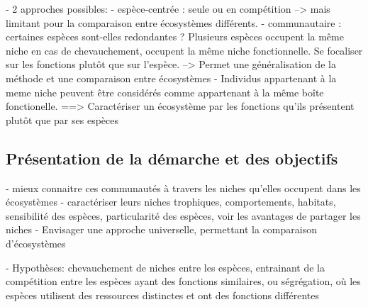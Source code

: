 - 2 approches possibles: 
		- espèce-centrée : seule ou en compétition --> mais limitant pour la comparaison entre écosystèmes différents. 
		- communautaire : certaines espèces sont-elles redondantes ? Plusieurs espèces
occupent la même niche en cas de chevauchement, occupent la même niche fonctionnelle. Se focaliser
sur les fonctions plutôt que sur l'espèce. --> Permet une généralisation de la méthode et une comparaison entre écosystèmes
		- Individus appartenant à la meme niche peuvent être considérés comme appartenant
à la même boîte fonctionelle. 
==> Caractériser un écosystème par les fonctions qu'ils présentent plutôt que par ses espèces

\subsection{Présentation de la démarche et des objectifs}
- mieux connaitre ces communautés à travers les niches qu'elles occupent dans les écosystèmes
- caractériser leurs niches trophiques, comportements, habitats, sensibilité des espèces, 
particularité des espèces, voir les avantages de partager les niches 
- Envisager une approche universelle, permettant la comparaison d'écosystèmes

- Hypothèses: chevauchement de niches entre les espèces, entrainant de la compétition entre les espèces ayant des fonctions similaires, ou ségrégation, où les espèces
utilisent des ressources distinctes et ont des fonctions différentes

